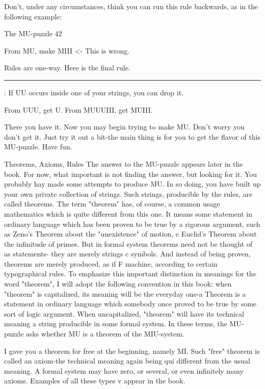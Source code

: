 Don't, under any circumstances, think you can run this rule backwards, as in the
following example:



The MU-puzzle                                                                            42

From MU, make MIII               <- This is wrong.

Rules are one-way.
       Here is the final rule.

\rule IV: If UU occurs inside one of your strings, you can drop it.\par


From UUU, get U.
From MUUUIII, get MUIII.

There you have it. Now you may begin trying to make MU. Don't worry you don't get it.
Just try it out a bit-the main thing is for you to get the flavor of this MU-puzzle. Have
fun.

                                 Theorems, Axioms, Rules
The answer to the MU-puzzle appears later in the book. For now, what important is not
finding the answer, but looking for it. You probably hay made some attempts to produce
MU. In so doing, you have built up your own private collection of strings. Such strings,
producible by the rules, are called theorems. The term "theorem" has, of course, a
common usage mathematics which is quite different from this one. It means some
statement in ordinary language which has been proven to be true by a rigorous argument,
such as Zeno's Theorem about the "unexistence" of motion, c Euclid's Theorem about the
infinitude of primes. But in formal system theorems need not be thought of as statements-
they are merely strings c symbols. And instead of being proven, theorems are merely
produced, as if F machine, according to certain typographical rules. To emphasize this
important distinction in meanings for the word "theorem", I will adopt the following
convention in this book: when "theorem" is capitalized, its meaning will be the everyday
one-a Theorem is a statement in ordinary language which somebody once proved to be
true by some sort of logic argument. When uncapitalized, "theorem" will have its
technical meaning a string producible in some formal system. In these terms, the MU-
puzzle asks whether MU is a theorem of the MIU-system.

I gave you a theorem for free at the beginning, namely MI. Such "free" theorem is called
an axiom-the technical meaning again being qui different from the usual meaning. A
formal system may have zero, or several, or even infinitely many axioms. Examples of all
these types v appear in the book.


